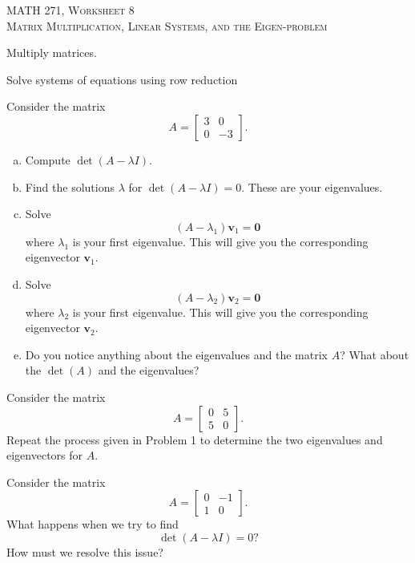 \documentclass[12pt]{article} %
\begin{document}
\begin{center}
   \textsc{\large MATH 271, Worksheet 8}\\
   \textsc{Matrix Multiplication, Linear Systems, and the Eigen-problem}
\end{center}
\vspace{.5cm}

\begin{problem}
Multiply matrices.
\end{problem}

\begin{problem}
Solve systems of equations using row reduction
\end{problem}

\begin{problem} Consider the matrix 
\[
A= \begin{bmatrix}
3 & 0\\
0 & -3
\end{bmatrix}.
\]
\begin{enumerate}[(a)]
    \item Compute $\det(A-\lambda I)$.
    \item Find the solutions $\lambda$ for $\det(A-\lambda I)=0$.  These are your eigenvalues.
    \item Solve 
    \[
    (A-\lambda_1)\mathbf{v}_1=\mathbf{0}
    \]
    where $\lambda_1$ is your first eigenvalue. This will give you the corresponding eigenvector $\mathbf{v}_1$.
    \item Solve 
    \[
    (A-\lambda_2)\mathbf{v}_2=\mathbf{0}
    \]
    where $\lambda_2$ is your first eigenvalue. This will give you the corresponding eigenvector $\mathbf{v}_2$.
    \item Do you notice anything about the eigenvalues and the matrix $A$? What about the $\det(A)$ and the eigenvalues?
\end{enumerate}
\end{problem}

\begin{problem}
Consider the matrix
\[
A=\begin{bmatrix}
0 & 5\\
5 & 0
\end{bmatrix}.
\]
Repeat the process given in Problem 1 to determine the two eigenvalues and eigenvectors for $A$.
\end{problem}

\begin{problem}
Consider the matrix 
\[
A=
\begin{bmatrix}
0 & -1\\
1 & 0
\end{bmatrix}.
\]
What happens when we try to find
\[
\det(A-\lambda I)=0? 
\]
How must we resolve this issue?
\end{problem}
\end{document}
